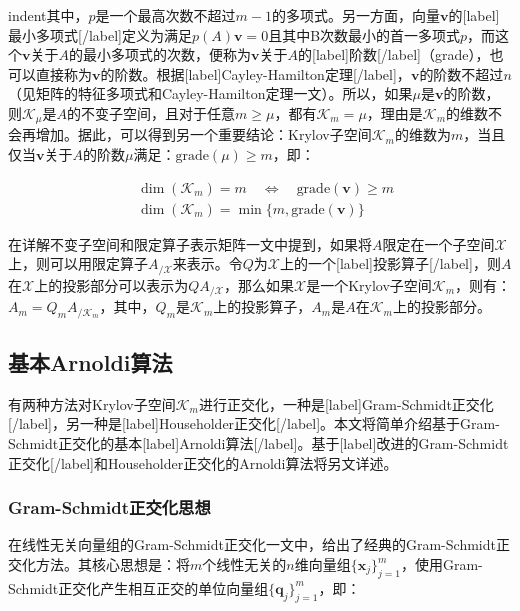 \documentclass[UTF8,nofonts]{ctexart}
\begin{document}
indent其中，$p$是一个最高次数不超过$m-1$的多项式。另一方面，向量$\boldsymbol{v}$的[label]最小多项式[/label]定义为满足$p(A)\boldsymbol{v}=0$且其中B次数最小的首一多项式$p$，而这个$\boldsymbol{v}$关于$A$的最小多项式的次数，便称为$\boldsymbol{v}$关于$A$的[label]阶数[/label]（grade），也可以直接称为$\boldsymbol{v}$的阶数。根据[label]Cayley-Hamilton定理[/label]，$\boldsymbol{v}$的阶数不超过$n$（见矩阵的特征多项式和Cayley-Hamilton定理一文）。所以，如果$\mu$是$\boldsymbol{v}$的阶数，则$\mathcal{K}_\mu$是$A$的不变子空间，且对于任意$m\geq\mu$，都有$\mathcal{K}_m=\mathcal{\mu}$，理由是$\mathcal{K}_m$的维数不会再增加。据此，可以得到另一个重要结论：Krylov子空间$\mathcal{K}_m$的维数为$m$，当且仅当$\boldsymbol{v}$关于$A$的阶数$\mu$满足：$\text{grade}(\mu)\geq m$，即：

\begin{eqnarray*}
& \dim(\mathcal{K}_m)=m\quad\Longleftrightarrow\quad\text{grade}(\boldsymbol{v})\geq m \\
& \dim(\mathcal{K}_m)=\min\{m,\text{grade}(\boldsymbol{v})\}
\end{eqnarray*}

在详解不变子空间和限定算子表示矩阵一文中提到，如果将$A$限定在一个子空间$\mathcal{X}$上，则可以用限定算子$A_{/\mathcal{X}}$来表示。令$Q$为$\mathcal{X}$上的一个[label]投影算子[/label]，则$A$在$\mathcal{X}$上的投影部分可以表示为$QA_{/\mathcal{X}}$，那么如果$\mathcal{X}$是一个Krylov子空间$\mathcal{K}_m$，则有：$A_m=Q_mA_{/\mathcal{K}_m}$，其中，$Q_m$是$\mathcal{K}_m$上的投影算子，$A_m$是$A$在$\mathcal{K}_m$上的投影部分。

\subsection*{基本Arnoldi算法}

有两种方法对Krylov子空间$\mathcal{K}_m$进行正交化，一种是[label]Gram-Schmidt正交化[/label]，另一种是[label]Householder正交化[/label]。本文将简单介绍基于Gram-Schmidt正交化的基本[label]Arnoldi算法[/label]。基于[label]改进的Gram-Schmidt正交化[/label]和Householder正交化的Arnoldi算法将另文详述。

\subsubsection*{Gram-Schmidt正交化思想}

在线性无关向量组的Gram-Schmidt正交化一文中，给出了经典的Gram-Schmidt正交化方法。其核心思想是：将$m$个线性无关的$n$维向量组$\{\boldsymbol{x}_j\}_{j=1}^m$，使用Gram-Schmidt正交化产生相互正交的单位向量组$\{\boldsymbol{q}_j\}_{j=1}^m$，即：
\end{document}

